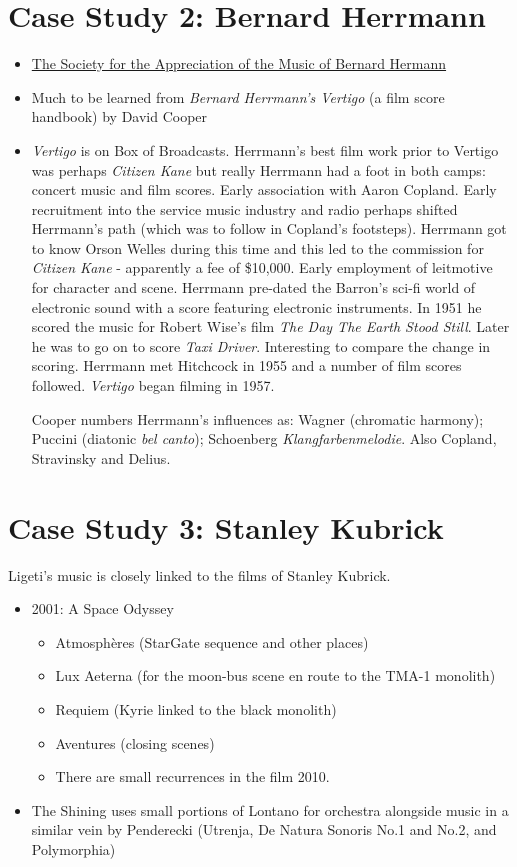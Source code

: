 \section{Case Study 2: Bernard Herrmann}
\begin{itemize}
\item \href{http://www.bernardherrmann.org/}
{The Society for the Appreciation of the Music of Bernard Hermann}
\item Much to be learned from \textit{Bernard Herrmann's Vertigo} (a film score handbook) by David Cooper \citep{cooper2001bernard}
\item \textit{Vertigo} is on Box of Broadcasts. 
Herrmann's best film work prior to Vertigo was perhaps \textit{Citizen Kane} but really Herrmann had a foot in both camps: concert music and film scores.  Early association with Aaron Copland. Early recruitment into the service music industry and radio perhaps shifted Herrmann's path (which was to follow in Copland's footsteps). Herrmann got to know Orson Welles during this time and this led to the commission for \textit{Citizen Kane} - apparently a fee of \$10,000. Early employment of leitmotive for character and scene. Herrmann pre-dated the Barron's sci-fi world of electronic sound with a score featuring electronic instruments. In 1951 he scored the music for Robert Wise's film \textit{The Day The Earth Stood Still}. Later he was to go on to score \textit{Taxi Driver}. Interesting to compare the change in scoring. Herrmann met Hitchcock in 1955 and a number of film scores followed. \textit{Vertigo} began filming in 1957.

Cooper \citeyearpar{cooper2001bernard} numbers Herrmann's influences as: Wagner (chromatic harmony); Puccini (diatonic \textit{bel canto}); Schoenberg \textit{Klangfarbenmelodie}. Also Copland, Stravinsky and Delius. 



\end{itemize}




\section{Case Study 3: Stanley Kubrick}
Ligeti's music is closely linked to the films of Stanley Kubrick. 
\begin{itemize}
\item 2001: A Space Odyssey
\begin{itemize}
\item Atmosphères (StarGate sequence and other places) 
\item Lux Aeterna (for the moon-bus scene en route to the TMA-1 monolith)
\item Requiem (Kyrie linked to the black monolith)
\item Aventures (closing scenes)
\item There are small recurrences in the film 2010.
\end{itemize}
\item The Shining uses small portions of Lontano for orchestra alongside music in a similar vein by Penderecki (Utrenja, De Natura Sonoris No.1 and No.2, and Polymorphia)
\end{itemize}


